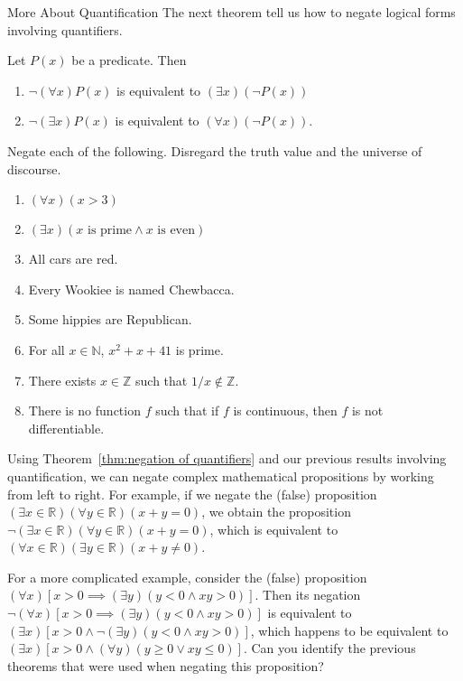 \begin{section}{More About Quantification}
The next theorem tell us how to negate logical forms involving quantifiers.

\begin{theorem}\label{thm:negation of quantifiers}
Let $P(x)$ be a predicate.  Then
\begin{enumerate}[label=\textrm{(\alph*)}]
\item $\neg (\forall x)P(x)$ is equivalent to $(\exists x)(\neg P(x))$
\item $\neg (\exists x)P(x)$ is equivalent to $(\forall x)(\neg P(x))$.
\end{enumerate}
\end{theorem}

\begin{problem}
Negate each of the following.  Disregard the truth value and the universe of discourse.
\begin{enumerate}[label=\textrm{(\alph*)}]
\item $(\forall x)(x>3)$
\item $(\exists x)(x \mbox{ is prime}\wedge x \mbox{ is even})$
\item All cars are red.
\item Every Wookiee is named Chewbacca.
\item Some hippies are Republican.
\item For all $x\in\mathbb{N}$, $x^2+x+41$ is prime.
\item There exists $x\in\mathbb{Z}$ such that $1/x\notin\mathbb{Z}$.
\item There is no function $f$ such that if $f$ is continuous, then $f$ is not differentiable.
\end{enumerate}
\end{problem}

Using Theorem~\ref{thm:negation of quantifiers} and our previous results involving quantification, we can negate complex mathematical propositions by working from left to right. For example, if we negate the (false) proposition $(\exists x\in\mathbb{R})(\forall y\in\mathbb{R})(x+y=0)$, we obtain the proposition $\neg(\exists x\in\mathbb{R})(\forall y\in\mathbb{R})(x+y=0)$, which is equivalent to $(\forall x\in\mathbb{R})(\exists y\in\mathbb{R})(x+y\neq 0)$. 

For a more complicated example, consider the (false) proposition $(\forall x)[x>0\implies (\exists y)(y<0 \wedge xy>0)]$. Then its negation $\neg (\forall x)[x>0\implies (\exists y)(y<0 \wedge xy>0)]$ is equivalent to $(\exists x)[x>0 \wedge \neg (\exists y)(y<0 \wedge xy>0)]$, which happens to be equivalent to $(\exists x)[x>0 \wedge (\forall y)(y\geq 0 \vee xy\leq 0)]$. Can you identify the previous theorems that were used when negating this proposition?


\end{section}
